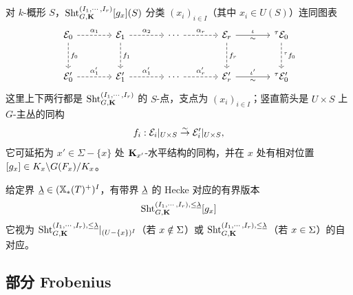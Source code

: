 对 $k$-概形 $S$，$\textup{Sht}^{(I_{1},\cdots, I_{r})}_{G,\mathbf{K}}[g_{x}](S)$ 分类 $(x_{i})_{i\in I}$（其中 $x_{i}\in U(S)$）连同图表
\begin{equation*}
\begin{tikzcd}[column sep=large, row sep=large]
\cE_{0} \arrow[d, dashed, "f_{0}"] \arrow[r, dashed, "\a_{1}"] &
\cE_{1} \arrow[d, dashed, "f_{1}"] \arrow[r, dashed, "\a_{2}"] &
\cdots \arrow[r, dashed, "\a_{r}"] &
\cE_{r} \arrow[d, dashed, "f_{r}"] \arrow[r, "\io", "\sim"'] &
{}^{\t}\cE_{0} \arrow[d, dashed, "{}^{\t}f_{0}"] \\
\cE'_{0} \arrow[r, dashed, "\a'_{1}"] &
\cE'_{1} \arrow[r, dashed, "\a'_{1}"] &
\cdots \arrow[r, dashed, "\a'_{r}"] &
\cE'_{r} \arrow[r, "\io'", "\sim"'] &
{}^{\t}\cE'_{0}
\end{tikzcd}
\end{equation*}
这里上下两行都是 $\textup{Sht}^{(I_{1},\cdots, I_{r})}_{G,\mathbf{K}}$ 的 $S$-点，支点为 $(x_{i})_{i\in I}$；竖直箭头是 $U\times S$ 上 $G$-主丛的同构
\begin{equation*}
f_{i}: \mathcal{E}_{i}|_{U\times S}\stackrel{\sim}{\to} \mathcal{E}'_{i}|_{U\times S},
\end{equation*}
它可延拓为 $x'\in \Sigma-\{x\}$ 处 $\mathbf{K}_{x'}$-水平结构的同构，并在 $x$ 处有相对位置 $[g_{x}]\in K_{x}\backslash G(F_{x})/K_{x}$。


给定界 $\underline{\lambda}\in (\mathbb{X}_*(T)^{+})^{I}$，有带界 $\underline{\lambda}$ 的 Hecke 对应的有界版本
\begin{equation*}
\textup{Sht}^{(I_{1},\cdots, I_{r}), \le \underline{\lambda}}_{G,\mathbf{K}}[g_{x}]
\end{equation*}
它视为 $\textup{Sht}^{(I_{1},\cdots, I_{r}), \le \underline{\lambda}}_{G,\mathbf{K}}|_{(U-\{x\})^{I}}$（若 $x\notin \Sigma$）或 $\textup{Sht}^{(I_{1},\cdots, I_{r}), \le \underline{\lambda}}_{G,\mathbf{K}}$（若 $x\in \Sigma$）的自对应。

\subsection{部分 Frobenius}

